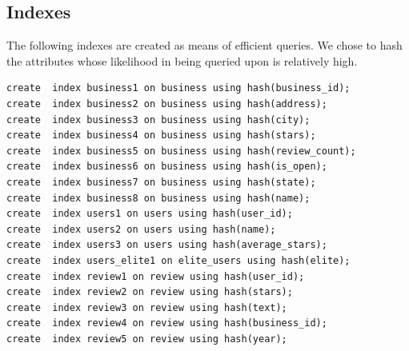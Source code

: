 \documentclass[a4paper, 11pt]{article}
\begin{document}
\subsection{Indexes}
The following indexes are created as means of efficient queries. We chose to hash the attributes whose likelihood in being queried upon is relatively high. 
\begin{verbatim}
create  index business1 on business using hash(business_id);
create  index business2 on business using hash(address);
create  index business3 on business using hash(city);
create  index business4 on business using hash(stars);
create  index business5 on business using hash(review_count);
create  index business6 on business using hash(is_open);
create  index business7 on business using hash(state);
create  index business8 on business using hash(name);
create  index users1 on users using hash(user_id);
create  index users2 on users using hash(name);
create  index users3 on users using hash(average_stars);
create  index users_elite1 on elite_users using hash(elite);
create  index review1 on review using hash(user_id);
create  index review2 on review using hash(stars);
create  index review3 on review using hash(text);
create  index review4 on review using hash(business_id);
create  index review5 on review using hash(year);
\end{verbatim}
\end{document}
